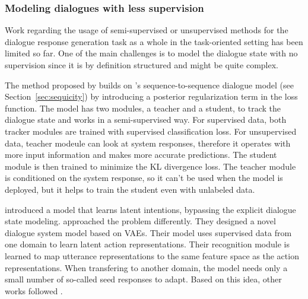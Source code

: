 \subsubsection{Modeling dialogues with less supervision}
Work regarding the usage of semi-supervised or unsupervised methods for the dialogue response generation task as a whole in the task-oriented setting has been limited so far.
One of the main challenges is to model the dialogue state with no supervision since it is by definition structured and might be quite complex.

The method proposed by \citet{jin2018explicit} builds on \citet{lei2018sequicity}'s sequence-to-sequence dialogue model (see Section~\ref{sec:sequicity}) by introducing a posterior regularization term in the loss function.
The model has two modules, a teacher and a student, to track the dialogue state and works in a semi-supervised way.
For supervised data, both tracker modules are trained with supervised classification loss.
For unsupervised data, teacher modeule can look at system responses, therefore it operates with more input information and makes more accurate predictions.
The student module is then trained to minimize the KL divergence loss.
The teacher module is conditioned on the system response, so it can't be used when the model is deployed, but it helps to train the student even with unlabeled data.

\citet{wen2017latent} introduced a model that learns latent intentions, bypassing the explicit dialogue state modeling.
\citet{zhao-eskenazi-2018-zero} approached the problem differently.
They designed a novel dialogue system model based on VAEs.
Their model uses supervised data from one domain to learn latent action representations.
Their recognition module is learned to map utterance representations to the same feature space as the action representations.
When transfering to another domain, the model needs only a small number of so-called seed responses to adapt.
Based on this idea, other works followed \citep{shalyminov-etal-2019-shot, huang2019mala}.

